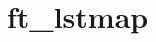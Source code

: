 \chapter{ft\+\_\+lstmap}
\hypertarget{md_Documentation_2ft__lstmap}{}\label{md_Documentation_2ft__lstmap}
